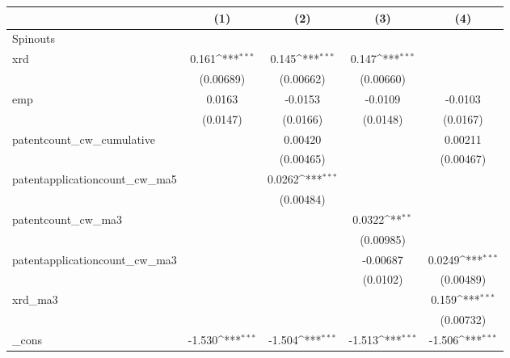 {
\def\sym#1{\ifmmode^{#1}\else\(^{#1}\)\fi}
\begin{tabular}{l*{4}{c}}
\hline\hline
            &\multicolumn{1}{c}{(1)}         &\multicolumn{1}{c}{(2)}         &\multicolumn{1}{c}{(3)}         &\multicolumn{1}{c}{(4)}         \\
\hline
Spinouts    &                     &                     &                     &                     \\
xrd         &       0.161\sym{***}&       0.145\sym{***}&       0.147\sym{***}&                     \\
            &   (0.00689)         &   (0.00662)         &   (0.00660)         &                     \\
[1em]
emp         &      0.0163         &     -0.0153         &     -0.0109         &     -0.0103         \\
            &    (0.0147)         &    (0.0166)         &    (0.0148)         &    (0.0167)         \\
[1em]
patentcount\_cw\_cumulative&                     &     0.00420         &                     &     0.00211         \\
            &                     &   (0.00465)         &                     &   (0.00467)         \\
[1em]
patentapplicationcount\_cw\_ma5&                     &      0.0262\sym{***}&                     &                     \\
            &                     &   (0.00484)         &                     &                     \\
[1em]
patentcount\_cw\_ma3&                     &                     &      0.0322\sym{**} &                     \\
            &                     &                     &   (0.00985)         &                     \\
[1em]
patentapplicationcount\_cw\_ma3&                     &                     &    -0.00687         &      0.0249\sym{***}\\
            &                     &                     &    (0.0102)         &   (0.00489)         \\
[1em]
xrd\_ma3     &                     &                     &                     &       0.159\sym{***}\\
            &                     &                     &                     &   (0.00732)         \\
[1em]
\_cons      &      -1.530\sym{***}&      -1.504\sym{***}&      -1.513\sym{***}&      -1.506\sym{***}\\

\end{tabular}}
